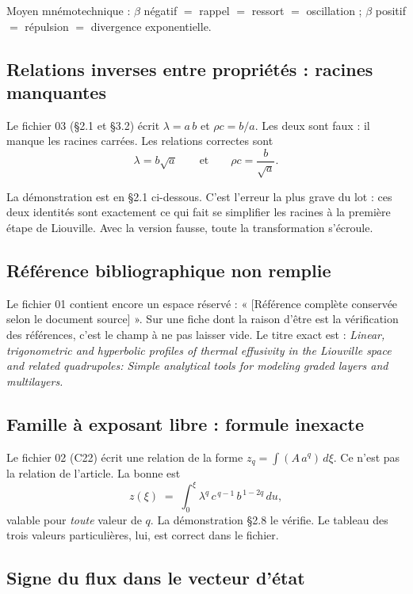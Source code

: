 \documentclass[11pt,a4paper]{article}
\begin{document}
Moyen mnémotechnique : $\beta$ négatif $=$ rappel $=$ ressort $=$ oscillation ; $\beta$ positif $=$
répulsion $=$ divergence exponentielle.

\subsection{Relations inverses entre propriétés : racines manquantes}

Le fichier 03 (§2.1 et §3.2) écrit $\lambda = a\,b$ et $\rho c = b/a$. Les deux sont faux : il manque
les racines carrées. Les relations correctes sont
\[ \lambda = b\sqrt{a}
\qquad\text{et}\qquad
\rho c = \frac{b}{\sqrt{a}} . \]

La démonstration est en §2.1 ci-dessous. C'est l'erreur la plus grave du lot : ces deux identités sont
exactement ce qui fait se simplifier les racines à la première étape de Liouville. Avec la version
fausse, toute la transformation s'écroule.

\subsection{Référence bibliographique non remplie}

Le fichier 01 contient encore un espace réservé : « [Référence complète conservée selon le document
source] ». Sur une fiche dont la raison d'être est la vérification des références, c'est le champ à ne
pas laisser vide. Le titre exact est : \emph{Linear, trigonometric and hyperbolic profiles of thermal
effusivity in the Liouville space and related quadrupoles: Simple analytical tools for modeling graded
layers and multilayers.}

\subsection{Famille à exposant libre : formule inexacte}

Le fichier 02 (C22) écrit une relation de la forme $z_q = \int (A\,a^q)\,d\xi$. Ce n'est pas la
relation de l'article. La bonne est
\[ z(\xi) \;=\; \int_0^{\xi} \lambda^{q}\, c^{\,q-1}\, b^{\,1-2q} \, du , \]
valable pour \emph{toute} valeur de $q$. La démonstration §2.8 le vérifie. Le tableau des trois valeurs
particulières, lui, est correct dans le fichier.

\subsection{Signe du flux dans le vecteur d'état}
\end{document}
